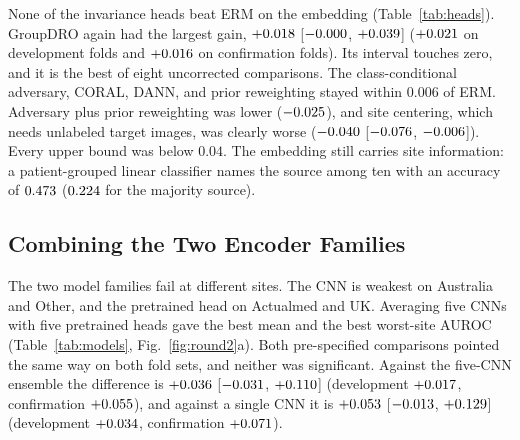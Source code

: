 \documentclass[journal]{IEEEtran}
\newcommand{\erm}{ERM}
\newcommand{\tabnote}[1]{\par\vspace{3pt}{\footnotesize\raggedright #1\par}}
\newcommand{\tabin}[1]{}
\begin{document}
None of the invariance heads beat \erm{} on the embedding (Table~\ref{tab:heads}). GroupDRO again had the largest gain, $+0.018$ [$-0.000$, $+0.039$] ($+0.021$ on development folds and $+0.016$ on confirmation folds). Its interval touches zero, and it is the best of eight uncorrected comparisons. The class-conditional adversary, CORAL, DANN, and prior reweighting stayed within $0.006$ of \erm{}. Adversary plus prior reweighting was lower ($-0.025$), and site centering, which needs unlabeled target images, was clearly worse ($-0.040$ [$-0.076$, $-0.006$]). Every upper bound was below $0.04$. The embedding still carries site information: a patient-grouped linear classifier names the source among ten with an accuracy of $0.473$ ($0.224$ for the majority source).
\begin{table}[!t]\centering\footnotesize\setlength{\tabcolsep}{1.5pt}
\caption{Training Methods on the Frozen Pretrained Embedding}\label{tab:heads}
\tabin{r2_heads.tex}
\tabnote{Five seeds; settings fixed before the confirmation run. $\Delta$ is the paired AUROC difference to the pretrained ERM head over eight sites with a hierarchical bootstrap 95\% interval.}
\end{table}

\subsection{Combining the Two Encoder Families}\label{sec:combine}
The two model families fail at different sites. The CNN is weakest on Australia and Other, and the pretrained head on Actualmed and UK. Averaging five CNNs with five pretrained heads gave the best mean and the best worst-site AUROC (Table~\ref{tab:models}, Fig.~\ref{fig:round2}a). Both pre-specified comparisons pointed the same way on both fold sets, and neither was significant. Against the five-CNN ensemble the difference is $+0.036$ [$-0.031$, $+0.110$] (development $+0.017$, confirmation $+0.055$), and against a single CNN it is $+0.053$ [$-0.013$, $+0.129$] (development $+0.034$, confirmation $+0.071$).
\end{document}
